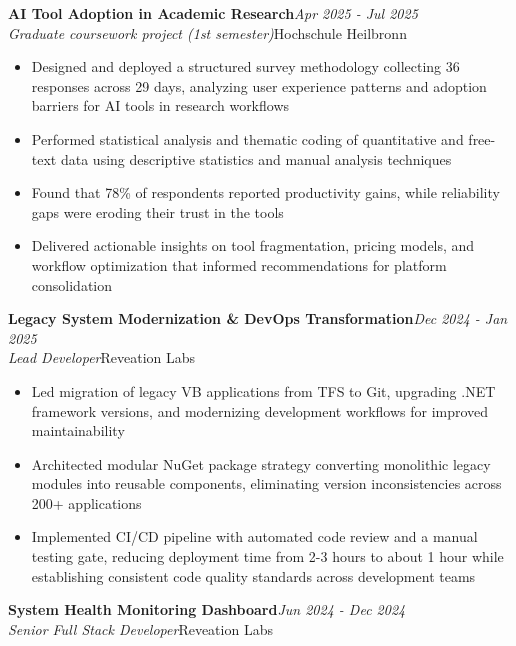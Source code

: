 \documentclass[a4paper,11pt]{article}
\newcommand{\resumeProject}[4]{%
\vspace{0.5mm}\item
    {\rightskip=0pt\relax
     \textbf{#1}\hfill\textit{\footnotesize{#3}}\\
     \footnotesize{\textit{#2}}\hfill\footnotesize{#4}\par}%
    \vspace{-2.4mm}
}
\newcommand{\resumeItemListStart}{\begin{justify}\begin{itemize}[leftmargin=3ex, rightmargin=2ex, noitemsep,labelsep=1.2mm,itemsep=0mm]\small}
\newcommand{\resumeItemListEnd}{\end{itemize}\end{justify}\vspace{-2mm}}
\begin{document}
    \vspace{-1 mm}
     \pagebreak[2]
     \resumeProject
      {AI Tool Adoption in Academic Research}{Graduate coursework project (1st semester)}{Apr 2025 - Jul 2025}{Hochschule Heilbronn}
      \resumeItemListStart
       \item {Designed and deployed a structured survey methodology collecting 36 responses across 29 days, analyzing user experience patterns and adoption barriers for AI tools in research workflows}
       \item {Performed statistical analysis and thematic coding of quantitative and free-text data using descriptive statistics and manual analysis techniques}
       \item {Found that 78\% of respondents reported productivity gains, while reliability gaps were eroding their trust in the tools}
       \item {Delivered actionable insights on tool fragmentation, pricing models, and workflow optimization that informed recommendations for platform consolidation}
    \resumeItemListEnd
    \vspace{-2mm}

    \vspace{-1 mm}
    \pagebreak[2]
    \resumeProject
    {Legacy System Modernization \& DevOps Transformation}{Lead Developer}{Dec 2024 - Jan 2025}{Reveation Labs}
    \resumeItemListStart
      \item {Led migration of legacy VB applications from TFS to Git, upgrading .NET framework versions, and modernizing development workflows for improved maintainability}
      \item {Architected modular NuGet package strategy converting monolithic legacy modules into reusable components, eliminating version inconsistencies across 200+ applications}
      \item {Implemented CI/CD pipeline with automated code review and a manual testing gate, reducing deployment time from 2-3 hours to about 1 hour while establishing consistent code quality standards across development teams}
    \resumeItemListEnd
    \vspace{-2 mm}
    
    \vspace{-1 mm}
    \pagebreak[2]
    \resumeProject
      {System Health Monitoring Dashboard}{Senior Full Stack Developer}{Jun 2024 - Dec 2024}{Reveation Labs}
         
\end{document}
